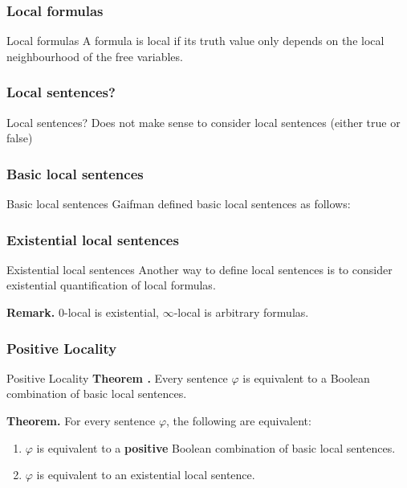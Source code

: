 \documentclass{beamer}
\newcommand{\tightlist}{}
\begin{document}
\subsubsection{Local formulas}\label{local-formulas}

\begin{frame}{Local formulas}
A formula is local if its truth value only depends on the local
neighbourhood of the free variables.
\end{frame}

\subsubsection{Local sentences?}\label{local-sentences}

\begin{frame}{Local sentences?}
Does not make sense to consider local sentences (either true or false)
\end{frame}

\subsubsection{Basic local sentences}\label{basic-local-sentences}

\begin{frame}{Basic local sentences}
Gaifman defined basic local sentences as follows:
\end{frame}

\subsubsection{Existential local
sentences}\label{existential-local-sentences}

\begin{frame}{Existential local sentences}
Another way to define local sentences is to consider existential
quantification of local formulas.

\textbf{Remark.} \(0\)-local is existential, \(\infty\)-local is
arbitrary formulas.
\end{frame}

\subsubsection{Positive Locality}\label{positive-locality}

\begin{frame}{Positive Locality}
\textbf{Theorem \autocite{GAIF82}.} Every sentence \(\varphi\) is
equivalent to a Boolean combination of basic local sentences.

\textbf{Theorem.} For every sentence \(\varphi\), the following are
equivalent:

\begin{enumerate}
\tightlist
\item
  \(\varphi\) is equivalent to a \textbf{positive} Boolean combination
  of basic local sentences.
\item
  \(\varphi\) is equivalent to an existential local sentence.
\end{enumerate}
\end{frame}
\end{document}
